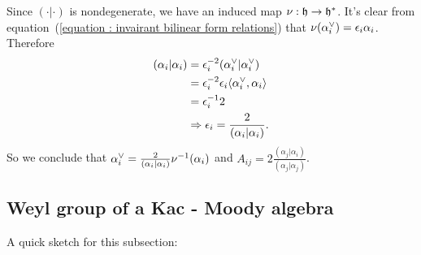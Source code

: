 Since $(\cdot|\cdot)$ is nondegenerate, we have an induced map $\nu:\mathfrak{h}\to\mathfrak{h}^*$. It's clear from equation~(\ref{equation : invairant bilinear form relations})
that $\nu(\alpha^{\vee}_i)=\epsilon_i\alpha_i$. Therefore
\begin{equation}\label{equation: epsilon in terms of the bilinear form}
    \begin{split}
        (\alpha_i|\alpha_i) &=\epsilon_i^{-2}(\alpha^{\vee}_i|\alpha^{\vee}_i)\\
        &=\epsilon_i^{-2}\epsilon_i\langle\alpha^{\vee}_i,\alpha_i\rangle\\
        &=\epsilon_i^{-1}2\\
        &\Rightarrow\epsilon_i = \frac{2}{(\alpha_i|\alpha_i)}.
    \end{split}
\end{equation}
So we conclude that $\alpha^{\vee}_i = \tfrac{2}{(\alpha_i|\alpha_i)}\nu^{-1}(\alpha_i)$ and 
$A_{ij} = 2\tfrac{(\alpha_j|\alpha_i)}{(\alpha_j|\alpha_j)}$.

\subsection{Weyl group of a Kac - Moody algebra}

A quick sketch for this subsection:
\begin{center}
\end{center}


